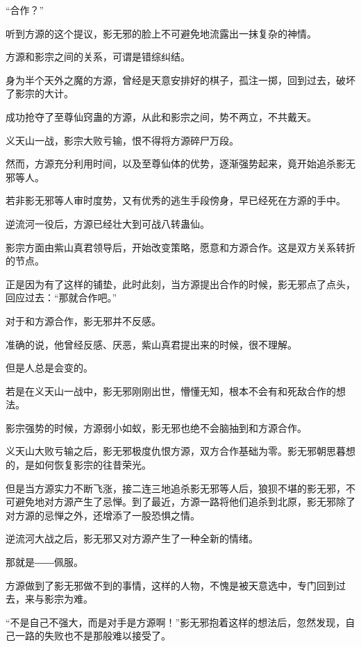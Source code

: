 
\begin{this_body}

“合作？”

听到方源的这个提议，影无邪的脸上不可避免地流露出一抹复杂的神情。

方源和影宗之间的关系，可谓是错综纠结。

身为半个天外之魔的方源，曾经是天意安排好的棋子，孤注一掷，回到过去，破坏了影宗的大计。

成功抢夺了至尊仙窍蛊的方源，从此和影宗之间，势不两立，不共戴天。

义天山一战，影宗大败亏输，恨不得将方源碎尸万段。

然而，方源充分利用时间，以及至尊仙体的优势，逐渐强势起来，竟开始追杀影无邪等人。

若非影无邪等人审时度势，又有优秀的逃生手段傍身，早已经死在方源的手中。

逆流河一役后，方源已经壮大到可战八转蛊仙。

影宗方面由紫山真君领导后，开始改变策略，愿意和方源合作。这是双方关系转折的节点。

正是因为有了这样的铺垫，此时此刻，当方源提出合作的时候，影无邪点了点头，回应过去：“那就合作吧。”

对于和方源合作，影无邪并不反感。

准确的说，他曾经反感、厌恶，紫山真君提出来的时候，很不理解。

但是人总是会变的。

若是在义天山一战中，影无邪刚刚出世，懵懂无知，根本不会有和死敌合作的想法。

影宗强势的时候，方源弱小如蚁，影无邪也绝不会脑抽到和方源合作。

义天山大败亏输之后，影无邪极度仇恨方源，双方合作基础为零。影无邪朝思暮想的，是如何恢复影宗的往昔荣光。

但是当方源实力不断飞涨，接二连三地追杀影无邪等人后，狼狈不堪的影无邪，不可避免地对方源产生了忌惮。到了最近，方源一路将他们追杀到北原，影无邪除了对方源的忌惮之外，还增添了一股恐惧之情。

逆流河大战之后，影无邪又对方源产生了一种全新的情绪。

那就是――佩服。

方源做到了影无邪做不到的事情，这样的人物，不愧是被天意选中，专门回到过去，来与影宗为难。

“不是自己不强大，而是对手是方源啊！”影无邪抱着这样的想法后，忽然发现，自己一路的失败也不是那般难以接受了。


\end{this_body}
